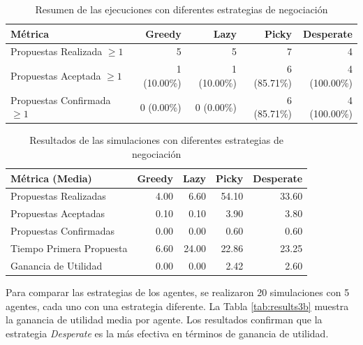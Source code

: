 \documentclass[12pt]{article}
\begin{document}
\begin{table}[h]
    \centering
    \begin{tabular}{|l|r|r|r|r|}
        \hline
        \textbf{Métrica}               & \textbf{Greedy} & \textbf{Lazy} & \textbf{Picky} & \textbf{Desperate} \\
        \hline
        Propuestas Realizada $\geq 1$  & 5               & 5             & 7              & 4                  \\
        \hline
        Propuestas Aceptada $\geq 1$   & 1 (10.00\%)     & 1 (10.00\%)   & 6 (85.71\%)    & 4 (100.00\%)       \\
        \hline
        Propuestas Confirmada $\geq 1$ & 0 (0.00\%)      & 0 (0.00\%)    & 6 (85.71\%)    & 4 (100.00\%)       \\
        \hline
    \end{tabular}
    \caption{Resumen de las ejecuciones con diferentes estrategias de negociación}
    \label{tab:summary3}
\end{table}

\begin{table}[h]
    \centering
    \begin{tabular}{|l|r|r|r|r|}
        \hline
        \textbf{Métrica (Media)} & \textbf{Greedy} & \textbf{Lazy} & \textbf{Picky} & \textbf{Desperate} \\
        \hline
        Propuestas Realizadas    & 4.00            & 6.60          & 54.10          & 33.60              \\
        \hline
        Propuestas Aceptadas     & 0.10            & 0.10          & 3.90           & 3.80               \\
        \hline
        Propuestas Confirmadas   & 0.00            & 0.00          & 0.60           & 0.60               \\
        \hline
        Tiempo Primera Propuesta & 6.60            & 24.00         & 22.86          & 23.25              \\
        \hline
        Ganancia de Utilidad     & 0.00            & 0.00          & 2.42           & 2.60               \\
        \hline
    \end{tabular}
    \caption{Resultados de las simulaciones con diferentes estrategias de negociación}
    \label{tab:results3}
\end{table}

Para comparar las estrategias de los agentes, se realizaron 20 simulaciones con 5 agentes, cada uno con una estrategia diferente.
La Tabla \ref{tab:results3b} muestra la ganancia de utilidad media por agente. Los resultados confirman que la estrategia \textit{Desperate} es la más efectiva en términos de ganancia de utilidad.
\end{document}
